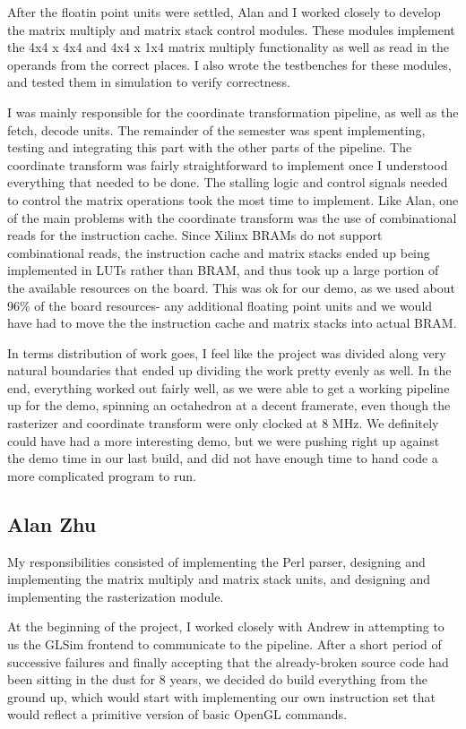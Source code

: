\documentclass[letterpaper,10pt]{article}
\begin{document}
After the floatin point units were settled, Alan and I worked closely to develop the matrix multiply and matrix stack control modules. These modules implement the 4x4 x 4x4 and 4x4 x 1x4 matrix multiply functionality as well as read in the operands from the correct places. I also wrote the testbenches for these modules, and tested them in simulation to verify correctness.

I was mainly responsible for the coordinate transformation pipeline, as well as the fetch, decode units. The remainder of the semester was spent implementing, testing and integrating this part with the other parts of the pipeline. The coordinate transform was fairly straightforward to implement once I understood everything that needed to be done. The stalling logic and control signals needed to control the matrix operations took the most time to implement. Like Alan, one of the main problems with the coordinate transform was the use of combinational reads for the instruction cache. Since Xilinx BRAMs do not support combinational reads, the instruction cache and matrix stacks ended up being implemented in LUTs rather than BRAM, and thus took up a large portion of the available resources on the board. This was ok for our demo, as we used about 96\% of the board resources- any additional floating point units and we would have had to move the the instruction cache and matrix stacks into actual BRAM.

In terms distribution of work goes, I feel like the project was divided along very natural boundaries that ended up dividing the work pretty evenly as well. In the end, everything worked out fairly well, as we were able to get a working pipeline up for the demo, spinning an octahedron at a decent framerate, even though the rasterizer and coordinate transform were only clocked at 8 MHz. We definitely could have had a more interesting demo, but we were pushing right up against the demo time in our last build, and did not have enough time to hand code a more complicated program to run.

\subsection{Alan Zhu}
My responsibilities consisted of implementing the Perl parser, designing and implementing the matrix multiply and matrix stack units, and designing and implementing the rasterization module.

At the beginning of the project, I worked closely with Andrew in attempting to us the GLSim frontend to communicate to the pipeline. After a short period of successive failures and finally accepting that the already-broken source code had been sitting in the dust for 8 years, we decided do build everything from the ground up, which would start with implementing our own instruction set that would reflect a primitive version of basic OpenGL commands. 
\end{document}
